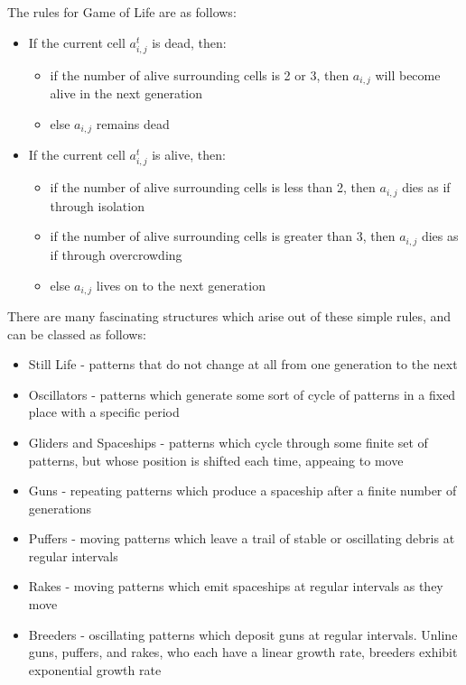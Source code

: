 \documentclass[11pt,a4paper]{article}
\begin{document}
    The rules for Game of Life are as follows:

    \begin{itemize}
        \item If the current cell $a_{i,j}^t$ is dead, then:
            \begin{itemize}
                \item if the number of alive surrounding cells is 2 or 3,
                    then $a_{i,j}$ will become alive in the next generation
                \item else $a_{i,j}$ remains dead
            \end{itemize}
        \item If the current cell $a_{i,j}^t$ is alive, then:
            \begin{itemize}
                \item if the number of alive surrounding cells is less than 2,
                    then $a_{i,j}$ dies as if through isolation
                \item if the number of alive surrounding cells is greater than
                    3, then $a_{i,j}$ dies as if through overcrowding
                \item else $a_{i,j}$ lives on to the next generation
            \end{itemize}
    \end{itemize}

    There are many fascinating structures which arise out of these simple rules,
    and can be classed as follows:

    \begin{itemize}
        \item Still Life - patterns that do not change at all from one
            generation to the next
        \item Oscillators - patterns which generate some sort of cycle of
            patterns in a fixed place with a specific period
        \item Gliders and Spaceships - patterns which cycle through some finite
            set of patterns, but whose position is shifted each time, appeaing
            to move
        \item Guns - repeating patterns which produce a spaceship after a finite
            number of generations
        \item Puffers - moving patterns which leave a trail of stable or
            oscillating debris at regular intervals
        \item Rakes - moving patterns which emit spaceships at regular intervals
            as they move
        \item Breeders - oscillating patterns which deposit guns at regular
            intervals. Unline guns, puffers, and rakes, who each have a linear
            growth rate, breeders exhibit exponential growth rate
    \end{itemize}
\end{document}
